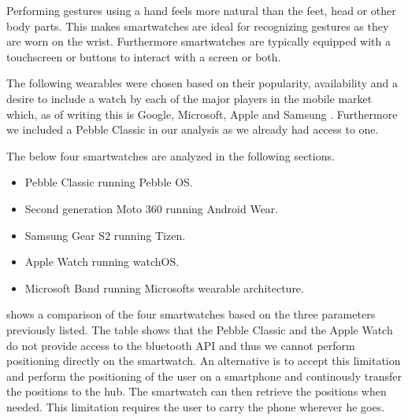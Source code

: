 Performing gestures using a hand feels more natural than the feet, head or other body parts. This makes smartwatches are ideal for recognizing gestures as they are worn on the wrist. Furthermore smartwatches are typically equipped with a touchscreen or buttons to interact with a screen or both.

The following wearables were chosen based on their popularity, availability and a desire to include a watch by each of the major players in the mobile market which, as of writing this is Google, Microsoft, Apple and Samsung . Furthermore we included a Pebble Classic in our analysis as we already had access to one.

The below four smartwatches are analyzed in the following sections.

\begin{itemize}
\item Pebble Classic running Pebble OS.
\item Second generation Moto 360 running Android Wear.
\item Samsung Gear S2 running Tizen.
\item Apple Watch running watchOS.
\item Microsoft Band running Microsofts wearable architecture.
\end{itemize}

 shows a comparison of the four smartwatches based on the three parameters previously listed. The table shows that the Pebble Classic and the Apple Watch do not provide access to the bluetooth API and thus we cannot perform positioning directly on the smartwatch. An alternative is to accept this limitation and perform the positioning of the user on a smartphone and continously transfer the positions to the hub. The smartwatch can then retrieve the positions when needed.
This limitation requires the user to carry the phone wherever he goes.

